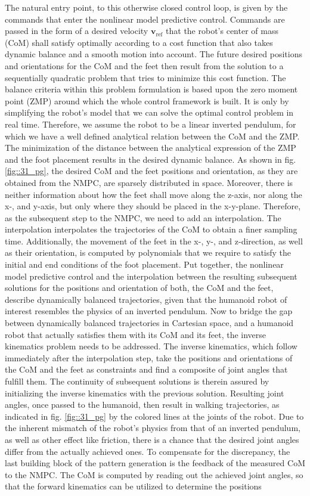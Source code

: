 The natural entry point, to this otherwise closed control loop, is given by the commands that enter the nonlinear model predictive control. Commands are passed in the form of a desired velocity $\mathbf{v}_\text{ref}$ that the robot's center of mass (CoM) shall satisfy optimally according to a cost function that also takes dynamic balance and a smooth motion into account. The future desired positions and orientations for the CoM and the feet then result from the solution to a sequentially quadratic problem that tries to minimize this cost function. The balance criteria within this problem formulation is based upon the zero moment point (ZMP) around which the whole control framework is built. It is only by simplifying the robot's model that we can solve the optimal control problem in real time. Therefore, we assume the robot to be a linear inverted pendulum, for which we have a well defined analytical relation between the CoM and the ZMP. The minimization of the distance between the analytical expression of the ZMP and the foot placement results in the desired dynamic balance. As shown in fig. \ref{fig::31_pg}, the desired CoM and the feet positions and orientation, as they are obtained from the NMPC, are sparsely distributed in space. Moreover, there is neither information about how the feet shall move along the z-axis, nor along the x-, and y-axis, but only where they should be placed in the x-y-plane. Therefore, as the subsequent step to the NMPC, we need to add an interpolation. The interpolation interpolates the trajectories of the CoM to obtain a finer sampling time. Additionally, the movement of the feet in the x-, y-, and z-direction, as well as their orientation, is computed by polynomials that we require to satisfy the initial and end conditions of the foot placement. Put together, the nonlinear model predictive control and the interpolation between the resulting subsequent solutions for the positions and orientation of both, the CoM and the feet, describe dynamically balanced trajectories, given that the humanoid robot of interest resembles the physics of an inverted pendulum. Now to bridge the gap between dynamically balanced trajectories in Cartesian space, and a humanoid robot that actually satisfies them with its CoM and its feet, the inverse kinematics problem needs to be addressed. The inverse kinematics, which follow immediately after the interpolation step, take the positions and orientations of the CoM and the feet as constraints and find a composite of joint angles that fulfill them. The continuity of subsequent solutions is therein assured by initializing the inverse kinematics with the previous solution. Resulting joint angles, once passed to the humanoid, then result in walking trajectories, as indicated in fig. \ref{fig::31_pg} by the colored lines at the joints of the robot. Due to the inherent mismatch of the robot's physics from that of an inverted pendulum, as well as other effect like friction, there is a chance that the desired joint angles differ from the actually achieved ones. To compensate for the discrepancy, the last building block of the pattern generation is the feedback of the measured CoM to the NMPC. The CoM is computed by reading out the achieved joint angles, so that the forward kinematics can be utilized to determine the positions 